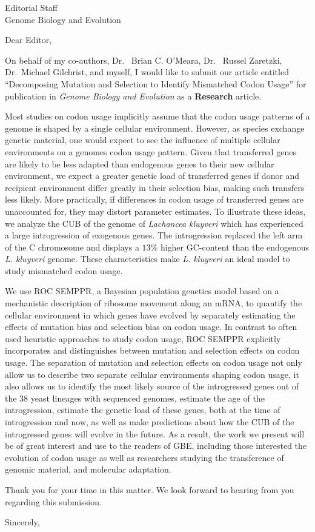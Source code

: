 \documentclass[11pt, letterpaper]{letter}
\begin{document}
\begin{letter}{Editorial Staff\\Genome Biology and Evolution}



\opening{Dear Editor,}

On behalf of my co-authors, Dr.~ Brian C. O'Meara, Dr.~ Russel Zaretzki, Dr.~Michael Gilchrist, and myself, I would like to submit our article entitled ``Decomposing Mutation and Selection to Identify Mismatched Codon Usage'' for publication in \emph{Genome Biology and Evolution} as a \textbf{Research} article. 

Most studies on codon usage implicitly assume that the codon usage patterns of a genome is shaped by a single cellular environment. 
However, as species exchange genetic material, one would expect to see the influence of multiple cellular environments on a genomes codon usage pattern.
Given that transferred genes are likely to be less adapted than endogenous genes to their new cellular environment, we expect a greater genetic load of transferred genes if donor and recipient environment differ greatly in their selection bias, making such transfers less likely.
More practically, if differences in codon usage of transferred genes are unaccounted for, they may distort parameter estimates.
To illustrate these ideas, we analyze the CUB of the genome of \emph{Lachancea kluyveri} which has experienced a large introgression of exogenous genes.
The introgression replaced the left arm of the C chromosome and displays a $13 \%$ higher GC-content than the endogenous \emph{L. kluyveri} genome.
These characteristics make \emph{L. kluyveri} an ideal model to study mismatched codon usage.

We use ROC SEMPPR, a Bayesian population genetics model based on a mechanistic description of ribosome movement along an mRNA, to quantify the cellular environment in which genes have evolved by separately estimating the effects of mutation bias and selection bias on codon usage.
In contrast to often used heuristic approaches to study codon usage, ROC SEMPPR explicitly incorporates and distinguishes between mutation and selection effects on codon usage.
The separation of mutation and selection effects on codon usage not only allow us to describe two separate cellular environments shaping codon usage, it also allows us to identify the most likely source of the introgressed genes out of the 38 yeast lineages with sequenced genomes, estimate the age of the introgression, estimate the genetic load of these genes, both at the time of introgression and now, as well as make predictions about how the CUB of the introgressed genes will evolve in the future.
As a result, the work we present will be of great interest and use to the readers of GBE, including those interested the evolution of codon usage as well as researchers studying the transference of genomic material, and molecular adaptation.

Thank you for your time in this matter.
We look forward to hearing from you regarding this submission.

\closing{Sincerely,}

\end{letter}
\end{document}
